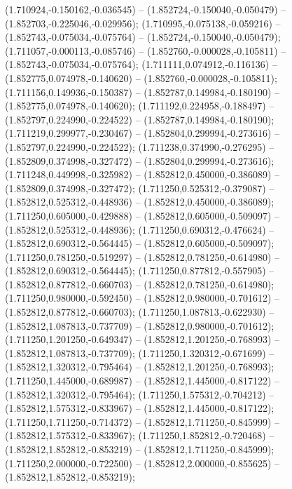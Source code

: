  (1.710924,-0.150162,-0.036545) -- (1.852724,-0.150040,-0.050479) -- (1.852703,-0.225046,-0.029956);
 (1.710995,-0.075138,-0.059216) -- (1.852743,-0.075034,-0.075764) -- (1.852724,-0.150040,-0.050479);
 (1.711057,-0.000113,-0.085746) -- (1.852760,-0.000028,-0.105811) -- (1.852743,-0.075034,-0.075764);
 (1.711111,0.074912,-0.116136) -- (1.852775,0.074978,-0.140620) -- (1.852760,-0.000028,-0.105811);
 (1.711156,0.149936,-0.150387) -- (1.852787,0.149984,-0.180190) -- (1.852775,0.074978,-0.140620);
 (1.711192,0.224958,-0.188497) -- (1.852797,0.224990,-0.224522) -- (1.852787,0.149984,-0.180190);
 (1.711219,0.299977,-0.230467) -- (1.852804,0.299994,-0.273616) -- (1.852797,0.224990,-0.224522);
 (1.711238,0.374990,-0.276295) -- (1.852809,0.374998,-0.327472) -- (1.852804,0.299994,-0.273616);
 (1.711248,0.449998,-0.325982) -- (1.852812,0.450000,-0.386089) -- (1.852809,0.374998,-0.327472);
 (1.711250,0.525312,-0.379087) -- (1.852812,0.525312,-0.448936) -- (1.852812,0.450000,-0.386089);
 (1.711250,0.605000,-0.429888) -- (1.852812,0.605000,-0.509097) -- (1.852812,0.525312,-0.448936);
 (1.711250,0.690312,-0.476624) -- (1.852812,0.690312,-0.564445) -- (1.852812,0.605000,-0.509097);
 (1.711250,0.781250,-0.519297) -- (1.852812,0.781250,-0.614980) -- (1.852812,0.690312,-0.564445);
 (1.711250,0.877812,-0.557905) -- (1.852812,0.877812,-0.660703) -- (1.852812,0.781250,-0.614980);
 (1.711250,0.980000,-0.592450) -- (1.852812,0.980000,-0.701612) -- (1.852812,0.877812,-0.660703);
 (1.711250,1.087813,-0.622930) -- (1.852812,1.087813,-0.737709) -- (1.852812,0.980000,-0.701612);
 (1.711250,1.201250,-0.649347) -- (1.852812,1.201250,-0.768993) -- (1.852812,1.087813,-0.737709);
 (1.711250,1.320312,-0.671699) -- (1.852812,1.320312,-0.795464) -- (1.852812,1.201250,-0.768993);
 (1.711250,1.445000,-0.689987) -- (1.852812,1.445000,-0.817122) -- (1.852812,1.320312,-0.795464);
 (1.711250,1.575312,-0.704212) -- (1.852812,1.575312,-0.833967) -- (1.852812,1.445000,-0.817122);
 (1.711250,1.711250,-0.714372) -- (1.852812,1.711250,-0.845999) -- (1.852812,1.575312,-0.833967);
 (1.711250,1.852812,-0.720468) -- (1.852812,1.852812,-0.853219) -- (1.852812,1.711250,-0.845999);
 (1.711250,2.000000,-0.722500) -- (1.852812,2.000000,-0.855625) -- (1.852812,1.852812,-0.853219);
